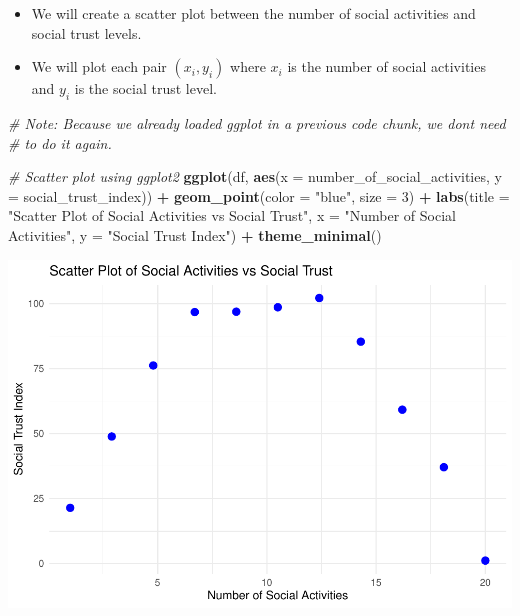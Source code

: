 \documentclass[
  11pt,
]{article}
\newenvironment{Shaded}{\begin{snugshade}}{\end{snugshade}}
\newcommand{\AttributeTok}[1]{\textcolor[rgb]{0.13,0.29,0.53}{#1}}
\newcommand{\CommentTok}[1]{\textcolor[rgb]{0.56,0.35,0.01}{\textit{#1}}}
\newcommand{\DecValTok}[1]{\textcolor[rgb]{0.00,0.00,0.81}{#1}}
\newcommand{\FunctionTok}[1]{\textcolor[rgb]{0.13,0.29,0.53}{\textbf{#1}}}
\newcommand{\NormalTok}[1]{#1}
\newcommand{\SpecialCharTok}[1]{\textcolor[rgb]{0.81,0.36,0.00}{\textbf{#1}}}
\newcommand{\StringTok}[1]{\textcolor[rgb]{0.31,0.60,0.02}{#1}}
\providecommand{\tightlist}{%
  \setlength{\itemsep}{0pt}\setlength{\parskip}{0pt}}
\begin{document}
\begin{itemize}
\tightlist
\item
  We will create a scatter plot between the number of social activities
  and social trust levels.
\item
  We will plot each pair \((x_i, y_i)\) where \(x_i\) is the number of
  social activities and \(y_i\) is the social trust level.
\end{itemize}

\begin{Shaded}
\begin{Highlighting}[]
\CommentTok{\# Note: Because we already loaded ggplot in a previous code chunk, we dont need}
\CommentTok{\# to do it again.}

\CommentTok{\# Scatter plot using ggplot2}
\FunctionTok{ggplot}\NormalTok{(df, }\FunctionTok{aes}\NormalTok{(}\AttributeTok{x =}\NormalTok{ number\_of\_social\_activities, }\AttributeTok{y =}\NormalTok{ social\_trust\_index)) }\SpecialCharTok{+} \FunctionTok{geom\_point}\NormalTok{(}\AttributeTok{color =} \StringTok{"blue"}\NormalTok{,}
    \AttributeTok{size =} \DecValTok{3}\NormalTok{) }\SpecialCharTok{+} \FunctionTok{labs}\NormalTok{(}\AttributeTok{title =} \StringTok{"Scatter Plot of Social Activities vs Social Trust"}\NormalTok{,}
    \AttributeTok{x =} \StringTok{"Number of Social Activities"}\NormalTok{, }\AttributeTok{y =} \StringTok{"Social Trust Index"}\NormalTok{) }\SpecialCharTok{+} \FunctionTok{theme\_minimal}\NormalTok{()}
\end{Highlighting}
\end{Shaded}

\includegraphics{Answers-PS1_files/figure-latex/unnamed-chunk-7-1.pdf}
\end{document}
